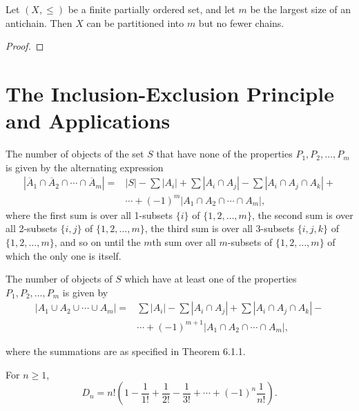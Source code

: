 \begin{theorem}
    \label{thm:5.6.2}
Let \((X, \leq)\) be a finite partially ordered set, and let \(m\) be the largest size of an antichain. Then \(X\) can be partitioned into \(m\) but no fewer chains.
\end{theorem}
\begin{proof} 
  \leanok
\end{proof}


\chapter{The Inclusion-Exclusion Principle and Applications}

\begin{theorem}
    \label{thm:6.1.1}
The number of objects of the set $S$ that have none of the properties $P_1, P_2, \ldots, P_m$ is given by the alternating expression
\begin{align*}
    |\overline{A}_1 \cap \overline{A}_2 \cap \cdots \cap \overline{A}_m| 
    = & |S| - \sum |A_i| + \sum |A_i \cap A_j| - \sum |A_i \cap A_j \cap A_k| + \\ 
    & \cdots + (-1)^m |A_1 \cap A_2 \cap \cdots \cap A_m|, \tag{6.2}
\end{align*}
where the first sum is over all 1-subsets $\{i\}$ of $\{1,2,\ldots,m\}$, the second sum is over all 2-subsets $\{i,j\}$ of $\{1,2,\ldots,m\}$, the third sum is over all 3-subsets $\{i,j,k\}$ of $\{1,2,\ldots,m\}$, and so on until the $m$th sum over all $m$-subsets of $\{1,2,\ldots,m\}$ of which the only one is itself.
\end{theorem} 


\begin{corollary}
    \label{cor:6.1.2}
The number of objects of $S$ which have at least one of the properties $P_1, P_2, \ldots, P_m$ is given by
\begin{align*}
    |A_1 \cup A_2 \cup \cdots \cup A_m| 
    = & \sum |A_i| - \sum |A_i \cap A_j| + \sum |A_i \cap A_j \cap A_k| - \\
    & \cdots + (-1)^{m+1} |A_1 \cap A_2 \cap \cdots \cap A_m|,
\tag{6.3}
\end{align*}

where the summations are as specified in Theorem 6.1.1.
\end{corollary}

\begin{theorem}
    \label{thm:6.3.1}
For $n \geq 1$,
\[
D_n = n! \left( 1 - \frac{1}{1!} + \frac{1}{2!} - \frac{1}{3!} + \cdots + (-1)^n \frac{1}{n!} \right).
\]
\end{theorem}

